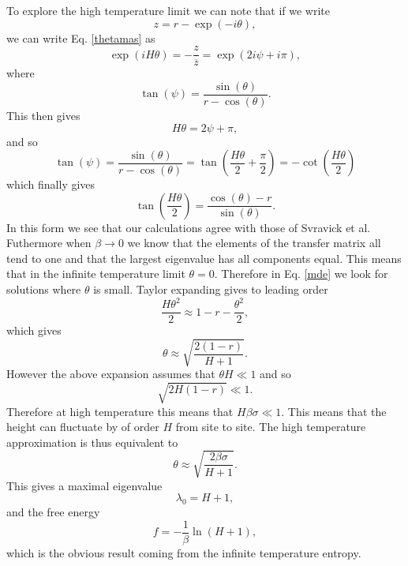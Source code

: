 To explore the high temperature limit we can note that if we write
\begin{equation}
    z= r-\exp(-i\theta),
\end{equation}
we can write Eq. \eqref{thetamas} as
\begin{equation}
    \exp(iH\theta)  = -\frac{z}{\overline z} = \exp(2i\psi + i\pi),
\end{equation}
where
\begin{equation}
    \tan(\psi) = \frac{\sin(\theta)}{r-\cos(\theta)}.
\end{equation}
This then gives 
\begin{equation}
    H\theta = 2\psi + \pi,
\end{equation}
and so
\begin{equation}
    \tan(\psi) = \frac{\sin(\theta)}{r-\cos(\theta)}= \tan(\frac{H\theta}{2} +\frac{\pi}{2})= -\cot(\frac{H\theta}{2})
\end{equation}
which finally gives
\begin{equation}
    \tan(\frac{H\theta}{2}) = \frac{\cos(\theta)-r}{\sin(\theta)}.
    \label{mde}
\end{equation}
In this form we see that our calculations agree with those of Svravick et al. Futhermore when $\beta\to 0$ we know that the elements of the transfer matrix all tend to one and that the largest eigenvalue has all components equal. This means that in the  infinite temperature limit $\theta=0$. Therefore in Eq. \eqref{mde} we look for solutions where $\theta$ is small. Taylor expanding gives to leading order
\begin{equation}
    \frac{H\theta^2}{2} \approx1-r-\frac{\theta^2}{2},
\end{equation}
which gives
\begin{equation}
    \theta \approx \sqrt{\frac{2(1-r)}{H+1}}.
\end{equation}
However the above expansion assumes that $\theta H\ll1$ and so
\begin{equation}
    \sqrt{2H(1-r)} \ll 1.
\end{equation}
Therefore at high temperature this means that $H\beta\sigma\ll1$. This means that the height can fluctuate by of order $H$ from site to site. The high temperature approximation is thus equivalent to
 \begin{equation}
    \theta \approx \sqrt{\frac{2\beta\sigma}{H+1}}.
\end{equation}
This gives a maximal eigenvalue
\begin{equation}
    \lambda_0 = H+1,
\end{equation}
and the free energy
\begin{equation}
    f=-\frac{1}{\beta}\ln(H+1),
\end{equation}
which is the obvious result coming from the infinite temperature entropy. 

